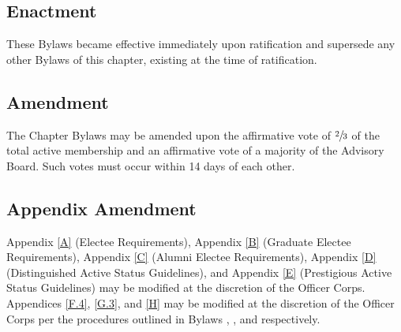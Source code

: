\subsection{Enactment} \label{IX.1}

These Bylaws became effective immediately upon ratification
and supersede any other Bylaws of this chapter, existing at the time of ratification.


\subsection{Amendment} \label{IX.2}

The Chapter Bylaws may be amended upon the affirmative
vote of $\sfrac{2}{3}$ of the total active membership and an affirmative vote of a majority of the
Advisory Board. Such votes must occur within 14 days of each other.


\subsection{Appendix Amendment} \label{IX.3}

Appendix \ref{A} (Electee Requirements), Appendix
\ref{B} (Graduate Electee Requirements), Appendix \ref{C} (Alumni Electee Requirements), Appendix
\ref{D} (Distinguished Active Status Guidelines), and Appendix \ref{E} (Prestigious Active Status
Guidelines) may be modified at the discretion of the Officer Corps. Appendices \ref{F.4}, \ref{G.3},
and \ref{H} may be modified at the discretion of the Officer Corps per the procedures outlined
in Bylaws , , and  respectively.